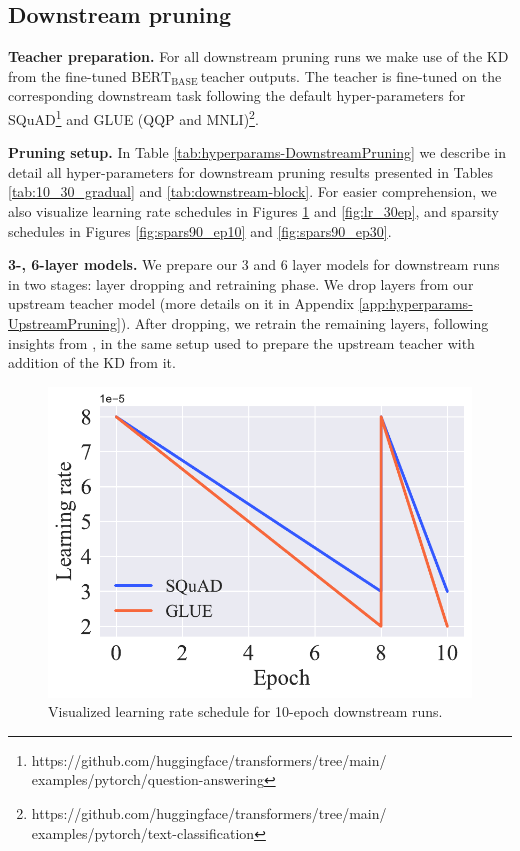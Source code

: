 \documentclass[11pt]{article}
\newcommand{\bert}{$\textrm{BERT}_{\textrm{BASE}}\,$}
\begin{document}
\subsection{Downstream pruning}
\label{app:hyperparams-DownstreamPruning}

\noindent\textbf{Teacher preparation.} For all downstream pruning runs we make use of the KD from the fine-tuned \bert teacher outputs. The teacher is fine-tuned on the corresponding downstream task following the default hyper-parameters for SQuAD\footnote{https://github.com/huggingface/transformers/tree/main/\\examples/pytorch/question-answering} and GLUE (QQP and MNLI)\footnote{https://github.com/huggingface/transformers/tree/main/\\examples/pytorch/text-classification}. 

\noindent\textbf{Pruning setup.} In Table \ref{tab:hyperparams-DownstreamPruning} we describe in detail all hyper-parameters for downstream pruning results presented in Tables \ref{tab:10_30_gradual} and \ref{tab:downstream-block}. For easier comprehension, we also visualize learning rate schedules in Figures \ref{fig:lr_10ep} and \ref{fig:lr_30ep}, and sparsity schedules in Figures \ref{fig:spars90_ep10} and \ref{fig:spars90_ep30}. 

\noindent\textbf{3-, 6-layer models.} We prepare our 3 and 6 layer models for downstream runs in two stages: layer dropping and retraining phase. We drop layers from our upstream teacher model (more details on it in Appendix \ref{app:hyperparams-UpstreamPruning}). After dropping, we retrain the remaining layers, following insights from \cite{Turc2019WellReadSL}, in the same setup used to prepare the upstream teacher with addition of the KD from it.

\begin{figure}[htb!]
    \centering
    \includegraphics[scale=0.5]{media/LR_10ep.pdf}
    \caption{Visualized learning rate schedule for 10-epoch downstream runs.}
    \label{fig:lr_10ep}
\end{figure}
\end{document}
